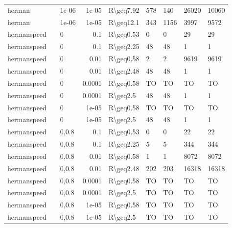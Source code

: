 \begin{longtable}{lllrlllll}
 herman        &           & 1e-06 & 1e-05  & R\textbackslash{}geq7.92  & 578  & 140  & 26020    & 10060   \\
 herman        &           & 1e-06 & 1e-05  & R\textbackslash{}geq12.1  & 343  & 1156 & 3997     & 9572    \\
 hermanspeed   &           & 0     & 0.1    & R\textbackslash{}geq0.53  & 0    & 0    & 29       & 29      \\
 hermanspeed   &           & 0     & 0.1    & R\textbackslash{}geq2.25  & 48   & 48   & 1        & 1       \\
 hermanspeed   &           & 0     & 0.01   & R\textbackslash{}geq0.58  & 2    & 2    & 9619     & 9619    \\
 hermanspeed   &           & 0     & 0.01   & R\textbackslash{}geq2.48  & 48   & 48   & 1        & 1       \\
 hermanspeed   &           & 0     & 0.0001 & R\textbackslash{}geq0.58  & TO   & TO   & TO       & TO      \\
 hermanspeed   &           & 0     & 0.0001 & R\textbackslash{}geq2.5   & 48   & 48   & 1        & 1       \\
 hermanspeed   &           & 0     & 1e-05  & R\textbackslash{}geq0.58  & TO   & TO   & TO       & TO      \\
 hermanspeed   &           & 0     & 1e-05  & R\textbackslash{}geq2.5   & 48   & 48   & 1        & 1       \\
 hermanspeed   &           & 0,0.8 & 0.1    & R\textbackslash{}geq0.53  & 0    & 0    & 22       & 22      \\
 hermanspeed   &           & 0,0.8 & 0.1    & R\textbackslash{}geq2.25  & 5    & 5    & 344      & 344     \\
 hermanspeed   &           & 0,0.8 & 0.01   & R\textbackslash{}geq0.58  & 1    & 1    & 8072     & 8072    \\
 hermanspeed   &           & 0,0.8 & 0.01   & R\textbackslash{}geq2.48  & 202  & 203  & 16318    & 16318   \\
 hermanspeed   &           & 0,0.8 & 0.0001 & R\textbackslash{}geq0.58  & TO   & TO   & TO       & TO      \\
 hermanspeed   &           & 0,0.8 & 0.0001 & R\textbackslash{}geq2.5   & TO   & TO   & TO       & TO      \\
 hermanspeed   &           & 0,0.8 & 1e-05  & R\textbackslash{}geq0.58  & TO   & TO   & TO       & TO      \\
 hermanspeed   &           & 0,0.8 & 1e-05  & R\textbackslash{}geq2.5   & TO   & TO   & TO       & TO      \\

\end{longtable}
